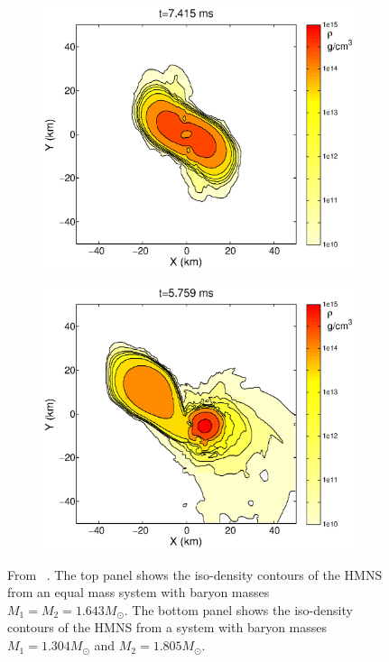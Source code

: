 \begin{figure}[!t]
\centering
\begin{subfigure}{.80\textwidth}
  \centering
  \includegraphics[width=.95\linewidth]{intro/Contours1}
\end{subfigure}
\begin{subfigure}{.80\textwidth}
  \centering
  \includegraphics[width=.95\linewidth]{intro/Contours2}
\end{subfigure}
\caption[Comparison of iso-density contours of an equal mass system and a non-equal mass system.]{From ~\cite{Rezzolla:2010fd}. The top panel shows the iso-density contours of the HMNS from an equal mass system with baryon masses $M_1=M_2=1.643M_{\odot}$. The bottom panel shows the iso-density contours of the HMNS from a system with baryon masses $M_1=1.304M_{\odot}$ and $M_2=1.805M_{\odot}$.}
\label{fig:Contours}
\end{figure}

